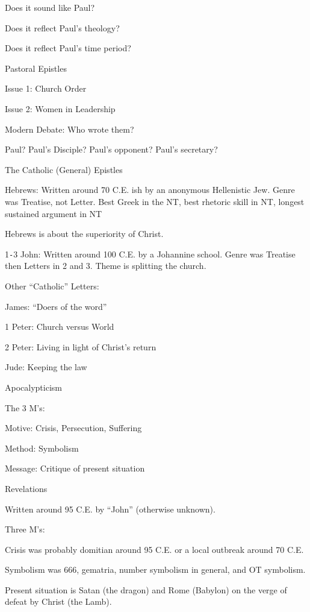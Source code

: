 \documentclass{article}
\begin{document}
    Does it sound like Paul?

    Does it reflect Paul's theology?
    
    Does it reflect Paul's time period?

    \centerline{Pastoral Epistles}

    Issue 1: Church Order

    Issue 2: Women in Leadership

    Modern Debate: Who wrote them?

    Paul? Paul's Disciple? Paul's opponent? Paul's secretary?

    \centerline{The Catholic (General) Epistles}

    Hebrews: Written around 70 C.E. ish by an anonymous Hellenistic Jew. Genre was Treatise, not Letter. Best Greek in the NT, best rhetoric skill in NT, longest sustained argument in NT

    Hebrews is about the superiority of Christ.

    1\texttt{-}3 John: Written around 100 C.E. by a Johannine school. Genre was Treatise then Letters in 2 and 3. Theme is splitting the church.

    Other ``Catholic'' Letters:

    James: ``Doers of the word''

    1 Peter: Church versus World

    2 Peter: Living in light of Christ's return

    Jude: Keeping the law

    \centerline{Apocalypticism}

    The 3 M's:

    Motive: Crisis, Persecution, Suffering

    Method: Symbolism

    Message: Critique of present situation

    \centerline{Revelations}

    Written around 95 C.E. by ``John'' (otherwise unknown).

    Three M's:

    Crisis was probably domitian around 95 C.E. or a local outbreak around 70 C.E.

    Symbolism was 666, gematria, number symbolism in general, and OT symbolism.

    Present situation is Satan (the dragon) and Rome (Babylon) on the verge of defeat by Christ (the Lamb).
\end{document}
